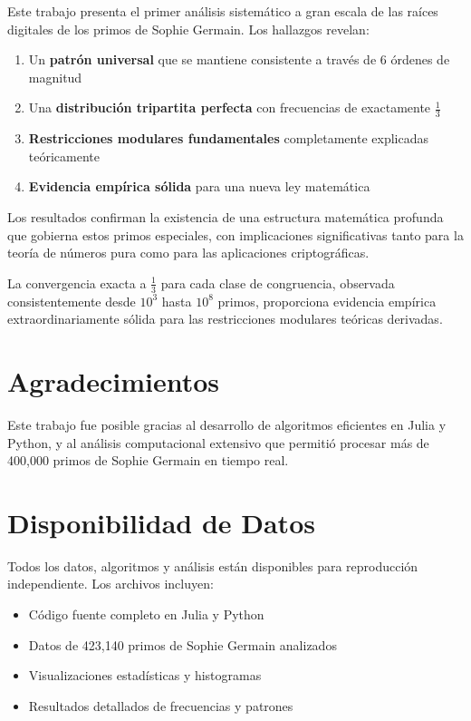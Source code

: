 \documentclass[11pt,a4paper]{article}
\theoremstyle{definition}
\theoremstyle{remark}
\begin{document}
Este trabajo presenta el primer análisis sistemático a gran escala de las raíces digitales de los primos de Sophie Germain. Los hallazgos revelan:

\begin{enumerate}
    \item Un \textbf{patrón universal} que se mantiene consistente a través de 6 órdenes de magnitud
    \item Una \textbf{distribución tripartita perfecta} con frecuencias de exactamente $\frac{1}{3}$
    \item \textbf{Restricciones modulares fundamentales} completamente explicadas teóricamente
    \item \textbf{Evidencia empírica sólida} para una nueva ley matemática
\end{enumerate}

Los resultados confirman la existencia de una estructura matemática profunda que gobierna estos primos especiales, con implicaciones significativas tanto para la teoría de números pura como para las aplicaciones criptográficas.

La convergencia exacta a $\frac{1}{3}$ para cada clase de congruencia, observada consistentemente desde $10^3$ hasta $10^8$ primos, proporciona evidencia empírica extraordinariamente sólida para las restricciones modulares teóricas derivadas.

\section*{Agradecimientos}

Este trabajo fue posible gracias al desarrollo de algoritmos eficientes en Julia y Python, y al análisis computacional extensivo que permitió procesar más de 400,000 primos de Sophie Germain en tiempo real.

\section*{Disponibilidad de Datos}

Todos los datos, algoritmos y análisis están disponibles para reproducción independiente. Los archivos incluyen:
\begin{itemize}
    \item Código fuente completo en Julia y Python
    \item Datos de 423,140 primos de Sophie Germain analizados
    \item Visualizaciones estadísticas y histogramas
    \item Resultados detallados de frecuencias y patrones
\end{itemize}
\end{document}
